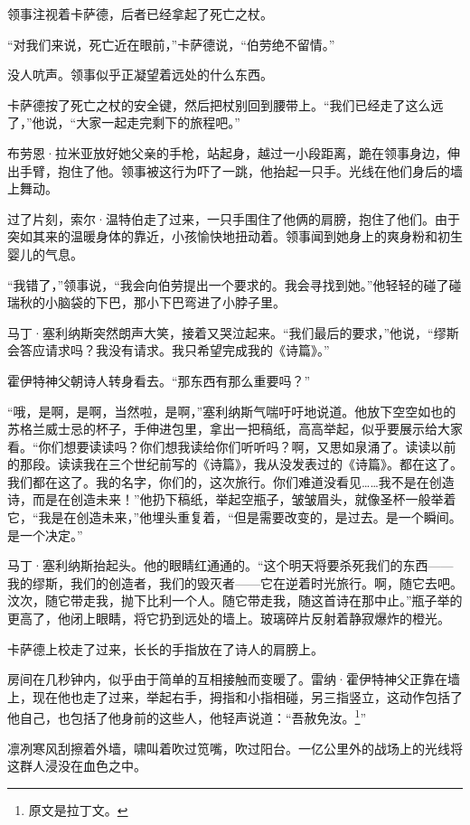 \documentclass[AutoFakeBold=true]{book}
\begin{document}
领事注视着卡萨德，后者已经拿起了死亡之杖。

``对我们来说，死亡近在眼前，''卡萨德说，``伯劳绝不留情。''

没人吭声。领事似乎正凝望着远处的什么东西。

卡萨德按了死亡之杖的安全键，然后把杖别回到腰带上。``我们已经走了这么远了，''他说，``大家一起走完剩下的旅程吧。''

布劳恩·拉米亚放好她父亲的手枪，站起身，越过一小段距离，跪在领事身边，伸出手臂，抱住了他。领事被这行为吓了一跳，他抬起一只手。光线在他们身后的墙上舞动。

过了片刻，索尔·温特伯走了过来，一只手围住了他俩的肩膀，抱住了他们。由于突如其来的温暖身体的靠近，小孩愉快地扭动着。领事闻到她身上的爽身粉和初生婴儿的气息。

``我错了，''领事说，``我会向伯劳提出一个要求的。我会寻找到她。''他轻轻的碰了碰瑞秋的小脑袋的下巴，那小下巴弯进了小脖子里。

马丁·塞利纳斯突然朗声大笑，接着又哭泣起来。``我们最后的要求，''他说，``缪斯会答应请求吗？我没有请求。我只希望完成我的《诗篇》。''

霍伊特神父朝诗人转身看去。``那东西有那么重要吗？''

``哦，是啊，是啊，当然啦，是啊，''塞利纳斯气喘吁吁地说道。他放下空空如也的苏格兰威士忌的杯子，手伸进包里，拿出一把稿纸，高高举起，似乎要展示给大家看。``你们想要读读吗？你们想我读给你们听听吗？啊，又思如泉涌了。读读以前的那段。读读我在三个世纪前写的《诗篇》，我从没发表过的《诗篇》。都在这了。我们都在这了。我的名字，你们的，这次旅行。你们难道没看见……我不是在创造诗，而是在创造未来！''他扔下稿纸，举起空瓶子，皱皱眉头，就像圣杯一般举着它，``我是在创造未来，''他埋头重复着，``但是需要改变的，是过去。是一个瞬间。是一个决定。''

马丁·塞利纳斯抬起头。他的眼睛红通通的。``这个明天将要杀死我们的东西——我的缪斯，我们的创造者，我们的毁灭者——它在逆着时光旅行。啊，随它去吧。汶次，随它带走我，抛下比利一个人。随它带走我，随这首诗在那中止。''瓶子举的更高了，他闭上眼睛，将它扔到远处的墙上。玻璃碎片反射着静寂爆炸的橙光。

卡萨德上校走了过来，长长的手指放在了诗人的肩膀上。

房间在几秒钟内，似乎由于简单的互相接触而变暖了。雷纳·霍伊特神父正靠在墙上，现在他也走了过来，举起右手，拇指和小指相碰，另三指竖立，这动作包括了他自己，也包括了他身前的这些人，他轻声说道：``{\kaishu 吾赦免汝。}\footnote{原文是拉丁文。}''

凛冽寒风刮擦着外墙，啸叫着吹过笕嘴，吹过阳台。一亿公里外的战场上的光线将这群人浸没在血色之中。
\end{document}
